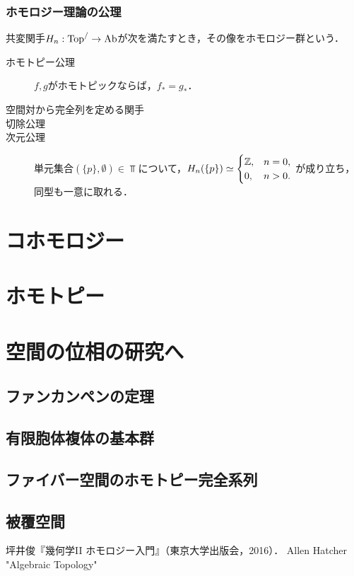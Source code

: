 \documentclass[uplatex,dvipdfmx]{jsreport}
\begin{document}
\subsection{ホモロジー理論の公理}

\begin{axiom}
    共変関手$H_n:\mathrm{Top}^{/}\to\mathrm{Ab}$が次を満たすとき，その像をホモロジー群という．
    \begin{description}
        \item[ホモトピー公理] $f,g$がホモトピックならば，$f_*=g_*$．
        \item[空間対から完全列を定める関手] 
        \item[切除公理] 
        \item[次元公理] 単元集合$(\{p\},\emptyset)\in\Top$について，$H_n(\{p\})\simeq
        \begin{cases}
            \mathbb{Z},&n=0,\\
            0,&n>0.
        \end{cases}$
        が成り立ち，同型も一意に取れる．
    \end{description}
\end{axiom}

\chapter{コホモロジー}

\chapter{ホモトピー}

\chapter{空間の位相の研究へ}

\section{ファンカンペンの定理}

\section{有限胞体複体の基本群}

\section{ファイバー空間のホモトピー完全系列}

\section{被覆空間}

\begin{thebibliography}{9}
    坪井俊『幾何学II ホモロジー入門』（東京大学出版会，2016）．
    Allen Hatcher "Algebraic Topology" 
\end{thebibliography}
\end{document}
